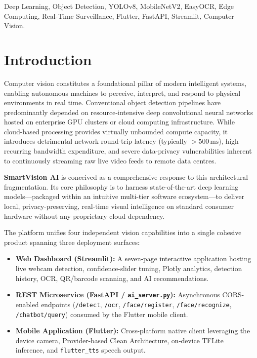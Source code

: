 \documentclass[conference]{IEEEtran}
\begin{document}
\begin{IEEEkeywords}
Deep Learning, Object Detection, YOLOv8, MobileNetV2, EasyOCR, Edge Computing,
Real-Time Surveillance, Flutter, FastAPI, Streamlit, Computer Vision.
\end{IEEEkeywords}

\section{Introduction}

Computer vision constitutes a foundational pillar of modern intelligent
systems, enabling autonomous machines to perceive, interpret, and respond to
physical environments in real time. Conventional object detection pipelines
have predominantly depended on resource-intensive deep convolutional neural
networks hosted on enterprise GPU clusters or cloud computing infrastructure.
While cloud-based processing provides virtually unbounded compute capacity,
it introduces detrimental network round-trip latency (typically
$>\!500\,\text{ms}$), high recurring bandwidth expenditure, and severe
data-privacy vulnerabilities inherent to continuously streaming raw live video
feeds to remote data centres.

\textbf{SmartVision AI} is conceived as a comprehensive response to this
architectural fragmentation. Its core philosophy is to harness state-of-the-art
deep learning models—packaged within an intuitive multi-tier software
ecosystem—to deliver local, privacy-preserving, real-time visual intelligence
on standard consumer hardware without any proprietary cloud dependency.

The platform unifies four independent vision capabilities into a single cohesive
product spanning three deployment surfaces:
\begin{itemize}
    \item \textbf{Web Dashboard (Streamlit):} A seven-page interactive
          application hosting live webcam detection, confidence-slider tuning,
          Plotly analytics, detection history, OCR, QR/barcode scanning, and
          AI recommendations.
    \item \textbf{REST Microservice (FastAPI / \texttt{ai\_server.py}):}
          Asynchronous CORS-enabled endpoints (\texttt{/detect}, \texttt{/ocr},
          \texttt{/face/register}, \texttt{/face/recognize},
          \texttt{/chatbot/query}) consumed by the Flutter mobile client.
    \item \textbf{Mobile Application (Flutter):} Cross-platform native client
          leveraging the device camera, Provider-based Clean Architecture,
          on-device TFLite inference, and \texttt{flutter\_tts} speech output.
\end{itemize}
\end{document}
